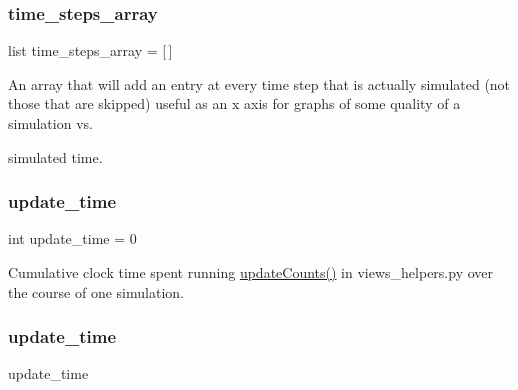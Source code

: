 \subsubsection{\texorpdfstring{time\_steps\_array}{time\_steps\_array}}
{\footnotesize\ttfamily list time\+\_\+steps\+\_\+array = \mbox{[}$\,$\mbox{]}\hspace{0.3cm}{\ttfamily [static]}}



An array that will add an entry at every time step that is actually simulated (not those that are skipped) useful as an x axis for graphs of some quality of a simulation vs. 

simulated time. \mbox{\label{classdynamicfilterapp_1_1test__simulations_1_1_simulation_test_ac218a6f58aae0da542fe9887eb8a6c21}} 
\subsubsection{\texorpdfstring{update\_time}{update\_time}\hspace{0.1cm}{\footnotesize\ttfamily [1/2]}}
{\footnotesize\ttfamily int update\+\_\+time = 0\hspace{0.3cm}{\ttfamily [static]}}



Cumulative clock time spent running \mbox{\hyperlink{namespacedynamicfilterapp_1_1views__helpers_a57d6ebd6f2f99cba59b82eded490891f}{update\+Counts()}} in views\+\_\+helpers.\+py over the course of one simulation. 

\mbox{\label{classdynamicfilterapp_1_1test__simulations_1_1_simulation_test_ae989b8400163febdffa0d452c256edd4}} 
\subsubsection{\texorpdfstring{update\_time}{update\_time}\hspace{0.1cm}{\footnotesize\ttfamily [2/2]}}
{\footnotesize\ttfamily update\+\_\+time}

\mbox{\label{classdynamicfilterapp_1_1test__simulations_1_1_simulation_test_ab4055eae9396bd4aed941b202095d298}} 
